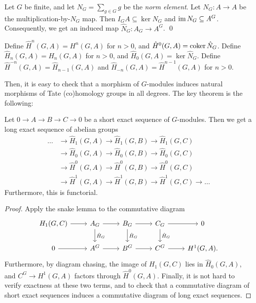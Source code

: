 \documentclass[11pt]{amsart}
\begin{document}
\begin{lem}
    Let $G$ be finite, and let $N_G = \sum_{g\in G} g$ be the \emph{norm element}. Let $N_G: A\to A$ be the multiplication-by-$N_G$ map. Then $I_G A \subseteq \ker N_G$ and $\operatorname{im} N_G\subseteq A^G$. Consequently, we get an induced map $\hat{N}_G: A_G\to A^G$. \qed
\end{lem}

\begin{defn}
    Define $\hat{H}^n(G,A) = H^n(G,A)$ for $n>0$, and $\hat{H}^0(G,A) = \operatorname{coker} \hat{N}_G$. Define $\hat{H}_n(G,A) = H_n(G,A)$ for $n>0$, and $\hat{H}_0(G,A) = \ker \hat{N}_G$. Define $\hat{H}^{-n}(G,A) = \hat{H}_{n-1}(G,A)$ and $\hat{H}_{-n}(G,A) = \hat{H}^{n-1}(G,A)$ for $n>0$.
\end{defn}

Then, it is easy to check that a morphism of $G$-modules induces natural morphisms of Tate (co)homology groups in all degrees. The key theorem is the following:

\begin{thm}
    Let $0\to A\to B\to C\to 0$ be a short exact sequence of $G$-modules. Then we get a long exact sequence of abelian groups
    \begin{align*}
        \dots &\to \hat{H}_1(G,A) \to \hat{H}_1(G,B) \to \hat{H}_1(G,C) \\
        &\to \hat{H}_0(G,A) \to \hat{H}_0(G,B) \to \hat{H}_0(G,C) \\
        &\to \hat{H}^0(G,A) \to \hat{H}^0(G,B) \to \hat{H}^0(G,C) \\
        &\to \hat{H}^1(G,A) \to \hat{H}^1(G,B) \to \hat{H}^1(G,C) \to\dots
    \end{align*}
    Furthermore, this is functorial.
\end{thm}


\begin{proof}
    Apply the snake lemma to the commutative diagram
    \[
    \begin{tikzcd}
        H_1(G,C) \arrow[r] & A_G \arrow[r] \arrow[d, "\hat{H}_G"] & B_G \arrow[r] \arrow[d, "\hat{H}_G"] & C_G \arrow[r] \arrow[d, "\hat{H}_G"] & 0 \\
        0 \arrow[r] & A^G \arrow[r] & B^G \arrow[r] & C^G \arrow[r] & H^1(G,A).
    \end{tikzcd}
    \]
    Furthermore, by diagram chasing, the image of $H_1(G,C)$ lies in $\hat{H}_0(G,A)$, and $C^G\to H^1(G,A)$ factors through $\hat{H}^0(G,A)$. Finally, it is not hard to verify exactness at these two terms, and to check that a commutative diagram of short exact sequences induces a commutative diagram of long exact sequences.
\end{proof}
\end{document}
